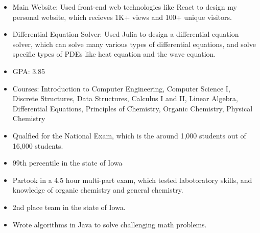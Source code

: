 \documentclass[10pt,a4paper,ragged2e,withhyper]{altacv}
\begin{document}
\begin{paracol}{2}
        \begin{itemize}
            \item Main Website: Used front-end web technologies like React to design my personal website, which recieves 1K+ views and 100+ unique visitors.
            \item Differential Equation Solver: Used Julia to design a differential equation solver, which can solve many various types of differential equations,
                  and solve specific types of PDEs like heat equation and the wave equation.
            


        \end{itemize}
        \divider


            \begin{itemize}
                \item GPA: 3.85
                \item Courses: Introduction to Computer Engineering, 
                               Computer Science I, 
                               Discrete Structures, 
                               Data Structures,
                               Calculus I and II, 
                               Linear Algebra, 
                               Differential Equations, 
                               Principles of Chemistry, 
                               Organic Chemistry, 
                               Physical Chemistry 
            \end{itemize}

            \begin{itemize}
                \item Qualfied for the National Exam, which is the around 1,000 students out of 16,000 students.
                \item 99th percentile in the state of Iowa
                \item Partook in a 4.5 hour multi-part exam, which tested labotoratory skills, and knowledge of 
                   organic chemistry and general chemistry.
            \end{itemize}
            \begin{itemize}
                \item 2nd place team in the state of Iowa.
                \item Wrote algorithms in Java to solve challenging math problems.
            \end{itemize}

    
    \end{paracol}
 
\end{document}
